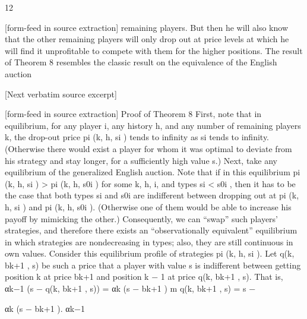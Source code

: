 \documentclass[10pt]{article}
\begin{document}
\begin{ReviewVerbatim}
12


[form-feed in source extraction]
remaining players. But then he will also know that the other remaining players will only drop out
at price levels at which he will find it unprofitable to compete with them for the higher positions.
The result of Theorem 8 resembles the classic result on the equivalence of the English auction

[Next verbatim source excerpt]


[form-feed in source extraction]
Proof of Theorem 8
First, note that in equilibrium, for any player i, any history h, and any number of remaining players
k, the drop-out price pi (k, h, si ) tends to infinity as si tends to infinity. (Otherwise there would
exist a player for whom it was optimal to deviate from his strategy and stay longer, for a sufficiently
high value s.) Next, take any equilibrium of the generalized English auction. Note that if in this
equilibrium pi (k, h, si ) > pi (k, h, s0i ) for some k, h, i, and types si < s0i , then it has to be the
case that both types si and s0i are indifferent between dropping out at pi (k, h, si ) and pi (k, h, s0i ).
(Otherwise one of them would be able to increase his payoff by mimicking the other.) Consequently,
we can “swap” such players’ strategies, and therefore there exists an “observationally equivalent”
equilibrium in which strategies are nondecreasing in types; also, they are still continuous in own
values. Consider this equilibrium profile of strategies pi (k, h, si ).
Let q(k, bk+1 , s) be such a price that a player with value s is indifferent between getting position
k at price bk+1 and position k − 1 at price q(k, bk+1 , s). That is,
αk−1 (s − q(k, bk+1 , s)) = αk (s − bk+1 )
m
q(k, bk+1 , s) = s −

αk
(s − bk+1 ).
αk−1


\end{ReviewVerbatim}
\end{document}
